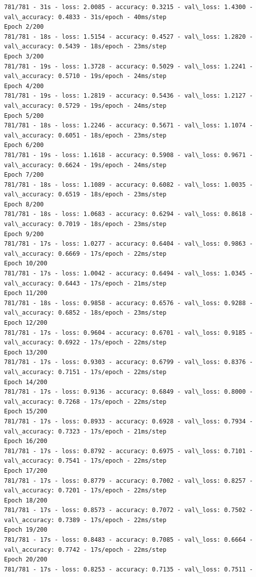 \documentclass[11pt]{article}
\begin{document}
    \begin{Verbatim}[commandchars=\\\{\}]
781/781 - 31s - loss: 2.0085 - accuracy: 0.3215 - val\_loss: 1.4300 -
val\_accuracy: 0.4833 - 31s/epoch - 40ms/step
Epoch 2/200
781/781 - 18s - loss: 1.5154 - accuracy: 0.4527 - val\_loss: 1.2820 -
val\_accuracy: 0.5439 - 18s/epoch - 23ms/step
Epoch 3/200
781/781 - 19s - loss: 1.3728 - accuracy: 0.5029 - val\_loss: 1.2241 -
val\_accuracy: 0.5710 - 19s/epoch - 24ms/step
Epoch 4/200
781/781 - 19s - loss: 1.2819 - accuracy: 0.5436 - val\_loss: 1.2127 -
val\_accuracy: 0.5729 - 19s/epoch - 24ms/step
Epoch 5/200
781/781 - 18s - loss: 1.2246 - accuracy: 0.5671 - val\_loss: 1.1074 -
val\_accuracy: 0.6051 - 18s/epoch - 23ms/step
Epoch 6/200
781/781 - 19s - loss: 1.1618 - accuracy: 0.5908 - val\_loss: 0.9671 -
val\_accuracy: 0.6624 - 19s/epoch - 24ms/step
Epoch 7/200
781/781 - 18s - loss: 1.1089 - accuracy: 0.6082 - val\_loss: 1.0035 -
val\_accuracy: 0.6519 - 18s/epoch - 23ms/step
Epoch 8/200
781/781 - 18s - loss: 1.0683 - accuracy: 0.6294 - val\_loss: 0.8618 -
val\_accuracy: 0.7019 - 18s/epoch - 23ms/step
Epoch 9/200
781/781 - 17s - loss: 1.0277 - accuracy: 0.6404 - val\_loss: 0.9863 -
val\_accuracy: 0.6669 - 17s/epoch - 22ms/step
Epoch 10/200
781/781 - 17s - loss: 1.0042 - accuracy: 0.6494 - val\_loss: 1.0345 -
val\_accuracy: 0.6443 - 17s/epoch - 21ms/step
Epoch 11/200
781/781 - 18s - loss: 0.9858 - accuracy: 0.6576 - val\_loss: 0.9288 -
val\_accuracy: 0.6852 - 18s/epoch - 23ms/step
Epoch 12/200
781/781 - 17s - loss: 0.9604 - accuracy: 0.6701 - val\_loss: 0.9185 -
val\_accuracy: 0.6922 - 17s/epoch - 22ms/step
Epoch 13/200
781/781 - 17s - loss: 0.9303 - accuracy: 0.6799 - val\_loss: 0.8376 -
val\_accuracy: 0.7151 - 17s/epoch - 22ms/step
Epoch 14/200
781/781 - 17s - loss: 0.9136 - accuracy: 0.6849 - val\_loss: 0.8000 -
val\_accuracy: 0.7268 - 17s/epoch - 22ms/step
Epoch 15/200
781/781 - 17s - loss: 0.8933 - accuracy: 0.6928 - val\_loss: 0.7934 -
val\_accuracy: 0.7323 - 17s/epoch - 21ms/step
Epoch 16/200
781/781 - 17s - loss: 0.8792 - accuracy: 0.6975 - val\_loss: 0.7101 -
val\_accuracy: 0.7541 - 17s/epoch - 22ms/step
Epoch 17/200
781/781 - 17s - loss: 0.8779 - accuracy: 0.7002 - val\_loss: 0.8257 -
val\_accuracy: 0.7201 - 17s/epoch - 22ms/step
Epoch 18/200
781/781 - 17s - loss: 0.8573 - accuracy: 0.7072 - val\_loss: 0.7502 -
val\_accuracy: 0.7389 - 17s/epoch - 22ms/step
Epoch 19/200
781/781 - 17s - loss: 0.8483 - accuracy: 0.7085 - val\_loss: 0.6664 -
val\_accuracy: 0.7742 - 17s/epoch - 22ms/step
Epoch 20/200
781/781 - 17s - loss: 0.8253 - accuracy: 0.7135 - val\_loss: 0.7511 -

\end{Verbatim}
\end{document}
